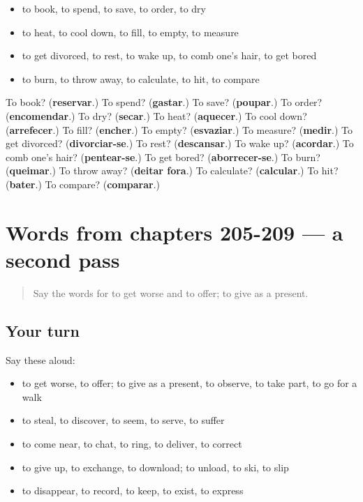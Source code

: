 \begin{itemize}
\raggedright
  \item to book, to spend, to save, to order, to dry
  \item to heat, to cool down, to fill, to empty, to measure
  \item to get divorced, to rest, to wake up, to comb one's hair, to get bored
  \item to burn, to throw away, to calculate, to hit, to compare
\end{itemize}

\begin{tcolorbox}[breakable,colback=teal!4,colframe=teal!35!black,title={Before you move on}]
To book? (\textbf{reservar}.) To spend? (\textbf{gastar}.) To save? (\textbf{poupar}.) To order? (\textbf{encomendar}.) To dry? (\textbf{secar}.) To heat? (\textbf{aquecer}.) To cool down? (\textbf{arrefecer}.) To fill? (\textbf{encher}.) To empty? (\textbf{esvaziar}.) To measure? (\textbf{medir}.) To get divorced? (\textbf{divorciar-se}.) To rest? (\textbf{descansar}.) To wake up? (\textbf{acordar}.) To comb one's hair? (\textbf{pentear-se}.) To get bored? (\textbf{aborrecer-se}.) To burn? (\textbf{queimar}.) To throw away? (\textbf{deitar fora}.) To calculate? (\textbf{calcular}.) To hit? (\textbf{bater}.) To compare? (\textbf{comparar}.)
\end{tcolorbox}
\section[(dialogue)]{Words from chapters 205-209 — a second pass}

\label{lesson:PT-R209-second-pass-words-from-chapters-205-209}



\begin{quote}
Say the words for to get worse and to offer; to give as a present.
\end{quote}

\subsection*{Your turn}
Say these aloud:

\begin{itemize}
\raggedright
  \item to get worse, to offer; to give as a present, to observe, to take part, to go for a walk
  \item to steal, to discover, to seem, to serve, to suffer
  \item to come near, to chat, to ring, to deliver, to correct
  \item to give up, to exchange, to download; to unload, to ski, to slip
  \item to disappear, to record, to keep, to exist, to express
\end{itemize}

